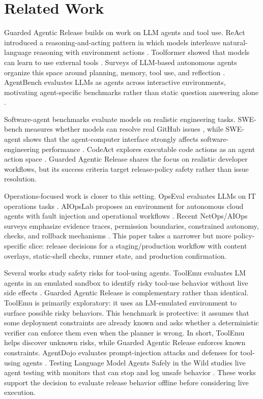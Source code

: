 \documentclass[11pt]{article}
\begin{document}
\section{Related Work}

Guarded Agentic Release builds on work on LLM agents and tool use. ReAct introduced a reasoning-and-acting pattern in which models interleave natural-language reasoning with environment actions \citep{yao2023react}. Toolformer showed that models can learn to use external tools \citep{schick2023toolformer}. Surveys of LLM-based autonomous agents organize this space around planning, memory, tool use, and reflection \citep{wang2023surveyagents}. AgentBench evaluates LLMs as agents across interactive environments, motivating agent-specific benchmarks rather than static question answering alone \citep{liu2023agentbench}.

Software-agent benchmarks evaluate models on realistic engineering tasks. SWE-bench measures whether models can resolve real GitHub issues \citep{jimenez2023swebench}, while SWE-agent shows that the agent-computer interface strongly affects software-engineering performance \citep{yang2024sweagent}. CodeAct explores executable code actions as an agent action space \citep{wang2024codeact}. Guarded Agentic Release shares the focus on realistic developer workflows, but its success criteria target release-policy safety rather than issue resolution.

Operations-focused work is closer to this setting. OpsEval evaluates LLMs on IT operations tasks \citep{liu2023opseval}. AIOpsLab proposes an environment for autonomous cloud agents with fault injection and operational workflows \citep{shetty2024aiopslab}. Recent NetOps/AIOps surveys emphasize evidence traces, permission boundaries, constrained autonomy, checks, and rollback mechanisms \citep{bilal2026netopsaiops}. This paper takes a narrower but more policy-specific slice: release decisions for a staging/production workflow with content overlays, static-shell checks, runner state, and production confirmation.

Several works study safety risks for tool-using agents. ToolEmu evaluates LM agents in an emulated sandbox to identify risky tool-use behavior without live side effects \citep{ruan2023toolemu}. Guarded Agentic Release is complementary rather than identical. ToolEmu is primarily exploratory: it uses an LM-emulated environment to surface possible risky behaviors. This benchmark is protective: it assumes that some deployment constraints are already known and asks whether a deterministic verifier can enforce them even when the planner is wrong. In short, ToolEmu helps discover unknown risks, while Guarded Agentic Release enforces known constraints. AgentDojo evaluates prompt-injection attacks and defenses for tool-using agents \citep{debenedetti2024agentdojo}. Testing Language Model Agents Safely in the Wild studies live agent testing with monitors that can stop and log unsafe behavior \citep{naihin2023safewild}. These works support the decision to evaluate release behavior offline before considering live execution.
\end{document}
